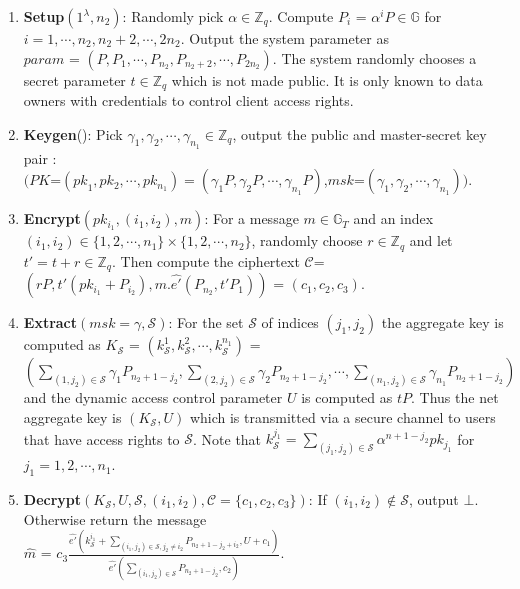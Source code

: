 \begin{enumerate}
 \item \textbf{Setup}$(1^{\lambda},n_2)$: Randomly pick $\alpha \in \mathbb{Z}_q$. Compute $P_i$ = ${\alpha^{i}}P \in \mathbb{G}$ for $i = 1,\cdots,n_2,n_2+2,\cdots,2n_2$. Output the system parameter as\\
 $param$ = $(P,P_1,\cdots,P_{n_2},P_{n_2+2},\cdots,P_{2n_2})$. The system randomly chooses a secret parameter $t \in \mathbb{Z}_q$ which is not made public. It is only known to data owners with credentials to control client access rights.
 \item \textbf{Keygen}(): Pick $\gamma_1,\gamma_2,\cdots,\gamma_{n_1} \in \mathbb{Z}_q$, output the public and master-secret key pair :\\ $(PK$=$({pk}_1,pk_{2},\cdots,pk_{n_1})=(\gamma_1P,\gamma_2P,\cdots,\gamma_{n_1}P)$,$msk$=$(\gamma_1,\gamma_2,\cdots,\gamma_{n_1}))$.
 \item \textbf{Encrypt}$(pk_{i_1},(i_1,i_2),m)$: For a message $m \in \mathbb{G}_T$ and an index $(i_1,i_2) \in \{1,2,\cdots,n_1\}\times\{1,2,\cdots,n_2\}$, randomly choose $r\in\mathbb{Z}_q$ and let $t'=t+r \in\mathbb{Z}_q$. Then compute the ciphertext $\mathcal{C}$=$(rP,t'{(pk_{i_1}+P_{i_2})},m.\hat{e'}(P_{n_2},t'P_1))$ = $(c_1,c_2,c_3)$.
 \item \textbf{Extract}$(msk=\gamma,\mathcal{S})$: For the set $\mathcal{S}$ of indices $(j_1,j_2)$ the aggregate key is computed as $K_{\mathcal{S}}$ = $(k^{1}_{\mathcal{S}},k^{2}_{\mathcal{S}},\cdots,k^{n_1}_{\mathcal{S}})$ =\\$(\sum_{(1,j_2)\in\mathcal{S}}{\gamma_{1}}P_{n_2+1-j_2},\sum_{(2,j_2)\in\mathcal{S}}{\gamma_{2}}P_{n_2+1-j_2},\cdots,\sum_{(n_1,j_2)\in\mathcal{S}}{\gamma_{n_1}}P_{n_2+1-j_2})$\\ and the dynamic access control parameter $U$ is computed as $tP$. Thus the net aggregate key is $(K_{\mathcal{S}},U)$ which is transmitted via a secure channel to users that have access rights to $\mathcal{S}$. Note that  $k^{j_1}_{\mathcal{S}}=\sum_{(j_1,j_2)\in\mathcal{S}}\alpha^{n+1-j_2}pk_{j_1}$ for $j_1=1,2,\cdots,n_1$. 
 \item \textbf{Decrypt}$(K_{\mathcal{S}}, U, \mathcal{S},(i_1,i_2),\mathcal{C}=\{c_1,c_2,c_3\})$: If $(i_1,i_2)\notin\mathcal{S}$, output $\bot$. Otherwise return the message\\ $\hat{m}$ = $c_3\frac{\hat{e'}(k^{i_1}_{\mathcal{S}}+\sum_{(i_1,j_2)\in\mathcal{S},j_2\neq i_2}P_{n_2+1-j_2+i_2},U+c_1)}{\hat{e'}(\sum_{(i_1,j_2)\in\mathcal{S}}P_{n_2+1-j_2},c_2)}$. 
\end{enumerate}

